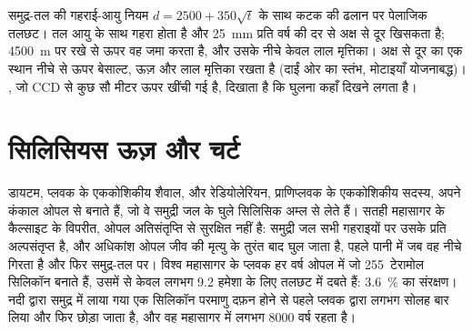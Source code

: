 \begin{omfigure}

{\small समुद्र-तल की गहराई-आयु नियम $d = 2500 + 350\sqrt t$ के साथ कटक की ढलान पर पेलाजिक तलछट। तल आयु के साथ गहरा होता है और \qty{25}{mm} प्रति वर्ष की दर से अक्ष से दूर खिसकता है; \qty{4500}{m} पर रखे  से ऊपर वह  जमा करता है, और उसके नीचे केवल लाल मृत्तिका। अक्ष से दूर का एक स्थान नीचे से ऊपर बेसाल्ट, ऊज़ और लाल मृत्तिका रखता है (दाईं ओर का स्तंभ, मोटाइयाँ योजनाबद्ध)। , जो CCD से कुछ सौ मीटर ऊपर खींची गई है, दिखाता है कि घुलना कहाँ दिखने लगता है।}
\label{fig:b1:chemical-biogenic-sediments:flank}
\end{omfigure}

\section{सिलिसियस ऊज़ और चर्ट}\label{sec:b1:chemical-biogenic-sediments:silica}

डायटम, प्लवक के एककोशिकीय शैवाल, और रेडियोलेरियन, प्राणिप्लवक के एककोशिकीय सदस्य, अपने कंकाल ओपल से बनाते हैं, जो वे समुद्री जल के घुले सिलिसिक अम्ल से लेते हैं। सतही महासागर के कैल्साइट के विपरीत, ओपल अतिसंतृप्ति से सुरक्षित नहीं है: समुद्री जल सभी गहराइयों पर उसके प्रति अल्पसंतृप्त है, और अधिकांश ओपल जीव की मृत्यु के तुरंत बाद घुल जाता है, पहले पानी में जब वह नीचे गिरता है और फिर समुद्र-तल पर। विश्व महासागर के प्लवक हर वर्ष ओपल में जो 255~टेरामोल सिलिकॉन बनाते हैं, उसमें से केवल लगभग 9.2 हमेशा के लिए तलछट में दबते हैं: \qty{3.6}{\%} का संरक्षण। नदी द्वारा समुद्र में लाया गया एक सिलिकॉन परमाणु दफ़न होने से पहले प्लवक द्वारा लगभग सोलह बार लिया और फिर छोड़ा जाता है, और वह महासागर में लगभग \num{8000} वर्ष रहता है।

